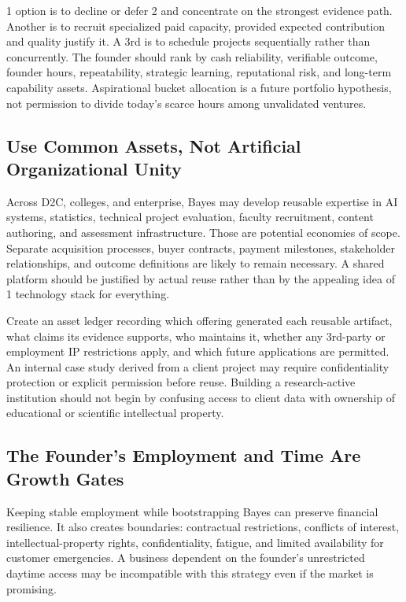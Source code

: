 1 option is to decline or defer 2 and concentrate on the strongest evidence path. Another is to recruit specialized paid capacity, provided expected contribution and quality justify it. A 3rd is to schedule projects sequentially rather than concurrently. The founder should rank by cash reliability, verifiable outcome, founder hours, repeatability, strategic learning, reputational risk, and long-term capability assets. Aspirational bucket allocation is a future portfolio hypothesis, not permission to divide today's scarce hours among unvalidated ventures.

\subsection{Use Common Assets, Not Artificial Organizational Unity}
\label{sec:common_assets_not_artificial_unity}

Across D2C, colleges, and enterprise, Bayes may develop reusable expertise in AI systems, statistics, technical project evaluation, faculty recruitment, content authoring, and assessment infrastructure. Those are potential economies of scope. Separate acquisition processes, buyer contracts, payment milestones, stakeholder relationships, and outcome definitions are likely to remain necessary. A shared platform should be justified by actual reuse rather than by the appealing idea of 1 technology stack for everything.

Create an asset ledger recording which offering generated each reusable artifact, what claims its evidence supports, who maintains it, whether any 3rd-party or employment IP restrictions apply, and which future applications are permitted. An internal case study derived from a client project may require confidentiality protection or explicit permission before reuse. Building a research-active institution should not begin by confusing access to client data with ownership of educational or scientific intellectual property.

\subsection{The Founder's Employment and Time Are Growth Gates}
\label{sec:founders_employment_time_growth_gates}

Keeping stable employment while bootstrapping Bayes can preserve financial resilience. It also creates boundaries: contractual restrictions, conflicts of interest, intellectual-property rights, confidentiality, fatigue, and limited availability for customer emergencies. A business dependent on the founder's unrestricted daytime access may be incompatible with this strategy even if the market is promising.

